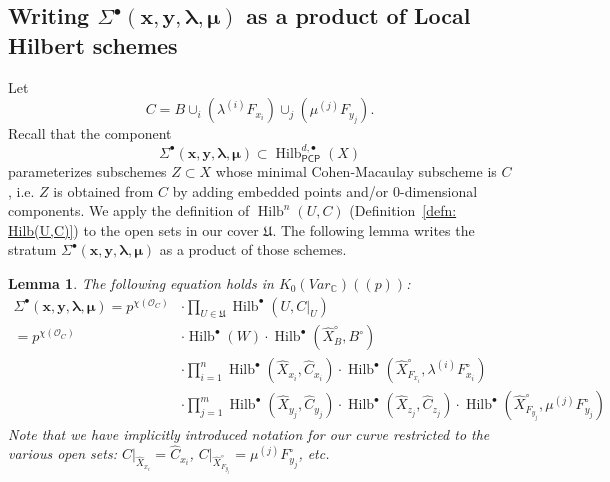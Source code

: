 \documentclass{amsart}
\newtheorem{lemma}[theorem]{Lemma}
\theoremstyle{definition}
\newcommand{\CC} {\mathbb{C}}          %
\renewcommand{\O}{\mathcal{O}}
\newcommand{\Hilb}{\operatorname{Hilb}}
\newcommand{\boldx}{\boldsymbol{x}}
\newcommand{\boldy}{\boldsymbol{y}}
\newcommand{\boldlambda}{\boldsymbol{\lambda }}
\newcommand{\boldmu}{\boldsymbol{\mu }}
\newcommand{\Sigmaxylambdamu}{\Sigma^{\bullet }(\boldx ,\boldy ,\boldlambda ,\boldmu )}
\renewcommand{\hat}{\widehat}
\newcommand{\Xhat}{\widehat{X}}
\newcommand{\PCP}{\mathsf{PCP}}
\begin{document}
\subsection{Writing
$\Sigmaxylambdamu $
as a product of Local Hilbert schemes}\label{subsec: products of local
Hilbert schemes} 
Let 
\[
C=B\cup_{i}\left(\lambda^{(i)}F_{x_{i}}
\right)\cup_{j}\left(\mu^{(j)}F_{y_{j}} \right).
\]
Recall that the component
\[
\Sigmaxylambdamu \subset \Hilb^{d,\bullet}_{\PCP}(X)
\]
parameterizes subschemes $Z\subset X$ whose minimal Cohen-Macaulay
subscheme is $C$, i.e. $Z$ is obtained from $C$ by adding embedded
points and/or 0-dimensional components. We apply the definition of
$\Hilb^{n}(U,C)$ (Definition~\ref{defn: Hilb(U,C)}) to the open sets
in our cover $\mathfrak{U}$. The following lemma writes the stratum
$\Sigma^{\bullet}(\boldx ,\boldy ,\boldlambda ,\boldmu ) $ as a
product of those schemes.
\begin{lemma}\label{lem: Sigma = product of local Hilbert schemes}
The following equation holds in $K_{0}(Var_{\CC})((p))$:
\begin{align*}
\Sigmaxylambdamu = p^{\chi
(\O_{C})}&\cdot  \prod_{U\in \mathfrak{U}} \Hilb^{\bullet}(U,C|_{U})\\
=p^{\chi (\O_{C})}& \cdot  \Hilb^{\bullet}(W)\cdot
\Hilb^{\bullet}(\Xhat^{\circ}_{B},B^{\circ})\\
&\cdot \prod_{i=1}^{n}
\Hilb^{\bullet}(\Xhat_{x_{i}},\hat{C}_{x_{i}})\cdot
\Hilb^{\bullet}(\Xhat^{\circ}_{F_{x_{i}}},\lambda^{(i)}F^{\circ}_{x_{i}})\\
&\cdot \prod_{j=1}^{m}
\Hilb^{\bullet}(\Xhat_{y_{j}},\hat{C}_{y_{j}})\cdot
\Hilb^{\bullet}(\Xhat_{z_{j}},\hat{C}_{z_{j}})\cdot
\Hilb^{\bullet}(\Xhat^{\circ}_{F_{y_{j}}},\mu^{(j)}F^{\circ}_{y_{j}})
\end{align*}
Note that we have implicitly introduced notation for our curve
restricted to the various open sets: $C|_{\Xhat_{x_{i}}}=\hat{C}_{x_{i}}$,
$C|_{\Xhat^{\circ}_{F_{y_{j}}}} = \mu^{(j)}F^{\circ}_{y_{j}}$, etc.
\end{lemma}
\end{document}
